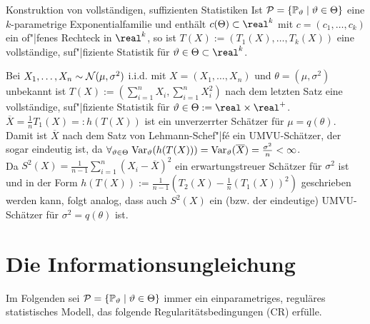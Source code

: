 \begin{Satz}{Konstruktion von vollständigen, suf{}fizienten Statistiken}
    Ist $\mathcal{P} = \{\mathbb{P}_\vartheta \;|\; \vartheta \in \Theta\}$ eine $k$-parametrige Exponentialfamilie und
    enthält $c(\Theta) \subset \real^k$ mit $c = (c_1, \dotsc, c_k)$
    ein of"|fenes Rechteck in $\real^k$, so ist
    $T(X) := (T_1(X), \dotsc, T_k(X))$ eine vollständige, suf"|fiziente Statistik für
    $\theta \in \Theta \subset \real^k$.
\end{Satz}

\linie
\pagebreak

\begin{Bsp}
    Bei $X_1, \dotsc, X_n \sim \mathcal{N}(\mu, \sigma^2)$ i.i.d. mit $X = (X_1, \dotsc, X_n)$ und
    $\theta = (\mu, \sigma^2)$ unbekannt ist $T(X) := (\sum_{i=1}^n X_i, \sum_{i=1}^n X_i^2)$
    nach dem letzten Satz eine vollständige, suf"|fiziente Statistik für
    $\theta \in \Theta := \real \times \real^+$.
    $\overline{X} = \frac{1}{n} T_1(X) =: h(T(X))$ ist ein unverzerrter Schätzer für
    $\mu = q(\theta)$.
    Damit ist $\overline{X}$ nach dem Satz von Lehmann-Schef"|fé ein UMVU-Schätzer, der sogar
    eindeutig ist, da $\forall_{\vartheta \in \Theta}\; \mathrm{Var}_\vartheta(h(T(X))) =
    \mathrm{Var}_\vartheta(\overline{X}) = \frac{\sigma^2}{n} < \infty$.\\
    Da $S^2(X) = \frac{1}{n-1} \sum_{i=1}^n (X_i - \overline{X})^2$ ein erwartungstreuer Schätzer
    für $\sigma^2$ ist und in der Form
    $h(T(X)) := \frac{1}{n-1} \left(T_2(X) - \frac{1}{n} (T_1(X))^2\right)$ geschrieben werden
    kann, folgt analog, dass auch $S^2(X)$ ein (bzw. der eindeutige)
    UMVU-Schätzer für $\sigma^2 = q(\theta)$ ist.
\end{Bsp}

\section{%
    Die Informationsungleichung%
}

\begin{Bem}
    Im Folgenden sei $\mathcal{P} = \{\mathbb{P}_\vartheta \;|\; \vartheta \in \Theta\}$ immer ein
    einparametriges, reguläres statistisches Modell, das folgende Regularitätsbedingungen
    (CR) erfülle.
\end{Bem}

